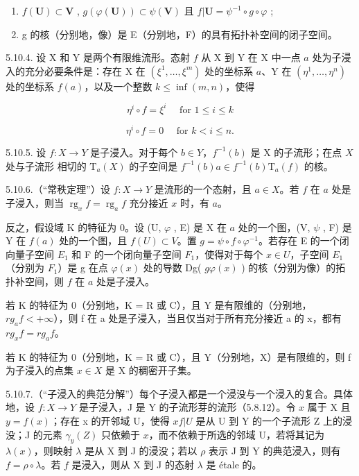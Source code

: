 \begin{enumerate}
\def\labelenumi{(\roman{enumi})}
\item
  \(f(\mathbf{U}) \subset \mathbf{V}\) , \(g(\varphi(\mathbf{U})) \subset \psi(\mathbf{V})\) 且 \(f|\mathbf{U} = \psi^{-1} \circ g \circ \varphi\) ;
\item
  g 的核（分别地，像）是 E（分别地，F）的具有拓扑补空间的闭子空间。
\end{enumerate}

5.10.4. 设 X 和 Y 是两个有限维流形。态射 \(f\) 从 X 到 Y 在 X 中一点 \(a\) 处为子浸入的充分必要条件是：存在 X 在 \((\xi^{1},\ldots,\xi^{m})\) 处的坐标系 \(a\)、Y 在 \((\eta^{1},\ldots,\eta^{n})\) 处的坐标系 \(f(a)\)，以及一个整数 \(k\leqslant\inf(m,n)\)，使得

\[
\eta^ {i} \circ f = \xi^ {i} \quad \text { for } 1 \leqslant i \leqslant k
\]

\[
\eta^ {i} \circ f = 0 \quad \text {   for   } k <   i \leqslant n.
\]

5.10.5. 设 \(f: X \to Y\) 是子浸入。对于每个 \(b \in Y\)，\(f^{-1}(b)\) 是 X 的子流形；在点 \(X\) 处与子流形  相切的 \(\mathrm{T}_{a}(X)\) 的子空间是 \(f^{-1}(b)\)\(a \in f^{-1}(b)\)\(\mathrm{T}_{a}(f)\) 的核。

5.10.6.（“常秩定理”）设 \(f: X \to Y\) 是流形的一个态射，且 \(a \in X\)。若 \(f\) 在 \(a\) 处是子浸入，则当 \(\operatorname{rg}_{x} f = \operatorname{rg}_{a} f\) 充分接近 \(x\) 时，有 \(a\)。

反之，假设域 K 的特征为 0。设 (U, \(\varphi\) , E) 是 X 在 \(a\) 处的一个图，(V, \(\psi\) , F) 是 Y 在 \(f(a)\) 处的一个图，且 \(f(U) \subset V\)。置 \(g = \psi \circ f \circ \varphi^{-1}\)。若存在 E 的一个闭向量子空间 \(E_{1}\) 和 F 的一个闭向量子空间 \(F_{1}\)，使得对于每个 \(x \in U\)，子空间 \(E_{1}\)（分别为 \(F_{1}\)）是 g 在点 \(\varphi(x)\) 处的导数 Dg( \(g\)\(\varphi(x)\) ) 的核（分别为像）的拓扑补空间，则 \(f\) 在 \(a\) 处是子浸入。

若 K 的特征为 0（分别地，K = R 或 C），且 Y 是有限维的（分别地，\(rg_{a}f < +\infty\)），则 f 在 a 处是子浸入，当且仅当对于所有充分接近 a 的 x，都有 \(rg_{x}f = rg_{a}f\)。

若 K 的特征为 0（分别地，K = R 或 C），且 Y（分别地，X）是有限维的，则 f 为子浸入的点集 \(x \in X\) 是 X 的稠密开子集。

5.10.7.（“子浸入的典范分解”）每个子浸入都是一个浸没与一个浸入的复合。具体地，设 \(f: X \to Y\) 是子浸入，J 是 Y 的子流形芽的流形（5.8.12）。令 \(x\) 属于 X 且 \(y = f(x)\)；存在 x 的开邻域 U，使得 \(x\)\(f|U\) 是从 U 到 Y 的一个子流形 Z 上的浸没；J 的元素 \(\gamma_y(Z)\) 只依赖于 \(x\)，而不依赖于所选的邻域 U，若将其记为 \(\lambda(x)\)，则映射 \(\lambda\) 是从 X 到 J 的浸没；若以 \(\rho\) 表示 J 到 Y 的典范浸入，则有 \(f = \rho \circ \lambda\)。若 \(f\) 是浸入，则从 X 到 J 的态射 \(\lambda\) 是 étale 的。

